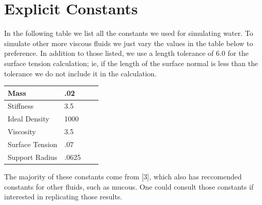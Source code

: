 \documentclass[11pt]{article}
\begin{document}
\section*{Explicit Constants}
In the following table we list all the constants we used for simulating water. To simulate other more viscous fluids we just vary the values in the table below to preference. In addition to those listed, we use a length tolerance of $6.0$ for the surface tension calculation; ie, if the length of the surface normal is less than the tolerance we do not include it in the calculation.

\begin{center}
    \begin{tabular}{| l | l | l | l |}
    \hline
    Mass & .02 \\ \hline
    Stiffness & 3.5\\ \hline
    Ideal Density & 1000 \\ \hline
    Viscosity & 3.5\\ \hline
    Surface Tension & .07 \\ \hline
    Support Radius & .0625 \\ \hline
    \end{tabular}
\end{center}
The majority of these constants come from [3], which also has reccomended constants for other fluids, such as mucous. One could consult those constants if interested in replicating those results.
\end{document}
